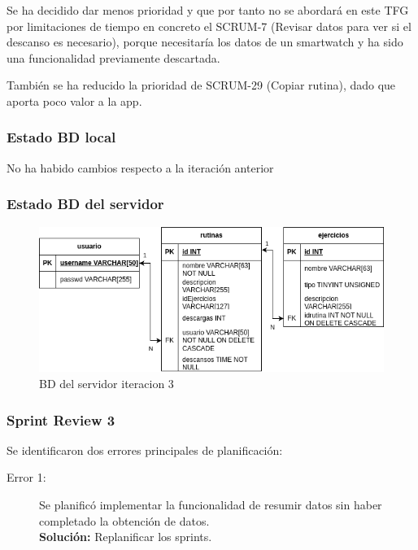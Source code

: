 Se ha decidido dar menos prioridad y que por tanto no se abordará en este TFG por limitaciones de tiempo en concreto el SCRUM-7 (Revisar datos para ver si el descanso es necesario), porque necesitaría los datos de un smartwatch y ha sido una funcionalidad previamente descartada.

También se ha reducido la prioridad de SCRUM-29 (Copiar rutina), dado que aporta poco valor a la app.

\subsubsection{Estado BD local}

No ha habido cambios respecto a la iteración anterior

\subsubsection{Estado BD del servidor}

\begin{figure}[H]
   \centering
    \includegraphics[width=\textwidth]{fotos/BD be iteracion 3.png}
    \caption{BD del servidor iteracion 3}
    \label{fig:BD be iteracion 3}
\end{figure}

\subsubsection{Sprint Review 3}

Se identificaron dos errores principales de planificación:

\begin{description}
  \item[Error 1:] Se planificó implementar la funcionalidad de resumir datos sin haber completado la obtención de datos. \\ \textbf{Solución:} Replanificar los sprints.
\end{description}

